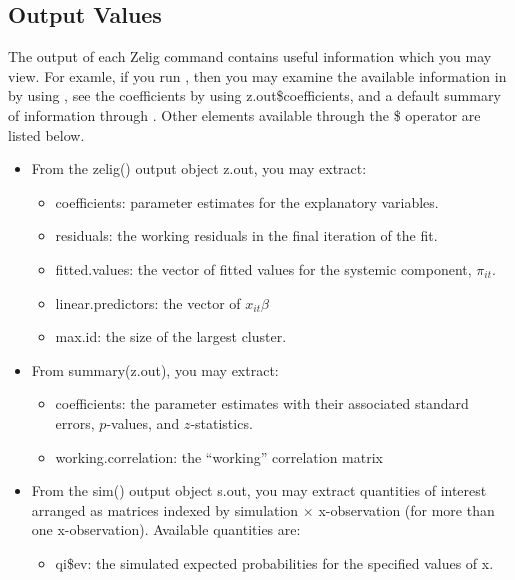 \documentclass[letterpaper,10pt,english]{sphinxmanual}
\begin{document}
\subsection{Output Values}
\label{vignette:id139}
The output of each Zelig command contains useful information which you
may view. For examle, if you run
, then you may
examine the available information in  by using
, see the coefficients by using z.out\$coefficients, and
a default summary of information through . Other
elements available through the \$ operator are listed below.
\begin{itemize}
\item {} 
From the zelig() output object z.out, you may extract:
\begin{itemize}
\item {} 
coefficients: parameter estimates for the explanatory variables.

\item {} 
residuals: the working residuals in the final iteration of the
fit.

\item {} 
fitted.values: the vector of fitted values for the systemic
component, \(\pi_{it}\).

\item {} 
linear.predictors: the vector of \(x_{it}\beta\)

\item {} 
max.id: the size of the largest cluster.

\end{itemize}

\item {} 
From summary(z.out), you may extract:
\begin{itemize}
\item {} 
coefficients: the parameter estimates with their associated
standard errors, \(p\)-values, and \(z\)-statistics.

\item {} 
working.correlation: the “working” correlation matrix

\end{itemize}

\item {} 
From the sim() output object s.out, you may extract quantities of
interest arranged as matrices indexed by simulation \(\times\)
x-observation (for more than one x-observation). Available quantities
are:
\begin{itemize}
\item {} 
qi\$ev: the simulated expected probabilities for the specified
values of x.


\end{itemize}
\end{itemize}
\end{document}
